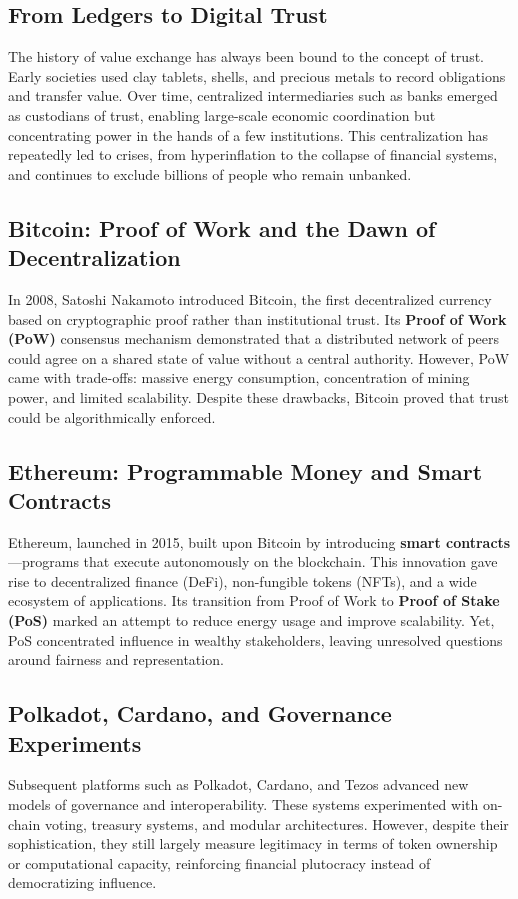 \documentclass[11pt,a4paper]{article}
\begin{document}
\subsection{From Ledgers to Digital Trust}
The history of value exchange has always been bound to the concept of trust. Early societies used clay tablets, shells, and precious metals to record obligations and transfer value. Over time, centralized intermediaries such as banks emerged as custodians of trust, enabling large-scale economic coordination but concentrating power in the hands of a few institutions. This centralization has repeatedly led to crises, from hyperinflation to the collapse of financial systems, and continues to exclude billions of people who remain unbanked.

\subsection{Bitcoin: Proof of Work and the Dawn of Decentralization}
In 2008, Satoshi Nakamoto introduced Bitcoin, the first decentralized currency based on cryptographic proof rather than institutional trust. Its \textbf{Proof of Work (PoW)} consensus mechanism demonstrated that a distributed network of peers could agree on a shared state of value without a central authority. However, PoW came with trade-offs: massive energy consumption, concentration of mining power, and limited scalability. Despite these drawbacks, Bitcoin proved that trust could be algorithmically enforced.

\subsection{Ethereum: Programmable Money and Smart Contracts}
Ethereum, launched in 2015, built upon Bitcoin by introducing \textbf{smart contracts}---programs that execute autonomously on the blockchain. This innovation gave rise to decentralized finance (DeFi), non-fungible tokens (NFTs), and a wide ecosystem of applications. Its transition from Proof of Work to \textbf{Proof of Stake (PoS)} marked an attempt to reduce energy usage and improve scalability. Yet, PoS concentrated influence in wealthy stakeholders, leaving unresolved questions around fairness and representation.

\subsection{Polkadot, Cardano, and Governance Experiments}
Subsequent platforms such as Polkadot, Cardano, and Tezos advanced new models of governance and interoperability. These systems experimented with on-chain voting, treasury systems, and modular architectures. However, despite their sophistication, they still largely measure legitimacy in terms of token ownership or computational capacity, reinforcing financial plutocracy instead of democratizing influence.
\end{document}
